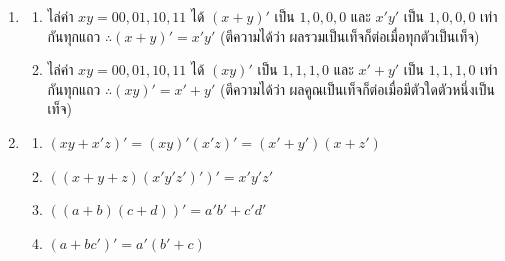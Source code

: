 \begin{enumerate}[resume*=anskey]
    \item
    \begin{enumerate}[label=\textbf{\thechapter.\arabic{enumi}.\arabic*}]
        \item ไล่ค่า $xy=00,01,10,11$ ได้ $(x+y)'$ เป็น $1,0,0,0$ และ $x'y'$ เป็น $1,0,0,0$ เท่ากันทุกแถว $\therefore (x+y)'=x'y'$ (ตีความได้ว่า ผลรวมเป็นเท็จก็ต่อเมื่อทุกตัวเป็นเท็จ)
        \item ไล่ค่า $xy=00,01,10,11$ ได้ $(xy)'$ เป็น $1,1,1,0$ และ $x'+y'$ เป็น $1,1,1,0$ เท่ากันทุกแถว $\therefore (xy)'=x'+y'$ (ตีความได้ว่า ผลคูณเป็นเท็จก็ต่อเมื่อมีตัวใดตัวหนึ่งเป็นเท็จ)
    \end{enumerate}

    \item
    \begin{enumerate}[label=\textbf{\thechapter.\arabic{enumi}.\arabic*}]
        \item $(xy+x'z)'=(xy)'(x'z)'=(x'+y')(x+z')$
        \item $((x+y+z)(x'y'z')')'=x'y'z'$
        \item $((a+b)(c+d))'=a'b'+c'd'$
        \item $(a+bc')'=a'(b'+c)$
    \end{enumerate}

\end{enumerate}


